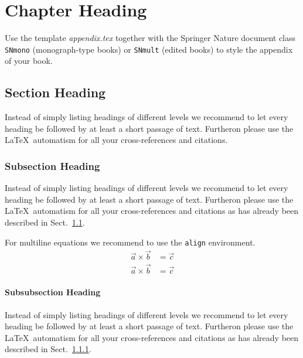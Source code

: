 \appendix
\chapter{Chapter Heading}
\label{introA} %

Use the template \emph{appendix.tex} together with the Springer Nature document class \texttt{SNmono} (monograph-type books) or \texttt{SNmult} (edited books) to style the appendix of your book.


\section{Section Heading}
\label{sec:A1}
Instead of simply listing headings of different levels we recommend to let every heading be followed by at least a short passage of text. Furtheron please use the \LaTeX\ automatism for all your cross-references and citations.


\subsection{Subsection Heading}
\label{sec:A2}
Instead of simply listing headings of different levels we recommend to let every heading be followed by at least a short passage of text. Furtheron please use the \LaTeX\ automatism for all your cross-references and citations as has already been described in Sect.~\ref{sec:A1}.

For multiline equations we recommend to use the \verb|align| environment.
\begin{align}
\vec{a}\times\vec{b}&=\vec{c} \nonumber\\
\vec{a}\times\vec{b}&=\vec{c}
\label{eq:A01}
\end{align}

\subsubsection{Subsubsection Heading}
Instead of simply listing headings of different levels we recommend to let every heading be followed by at least a short passage of text. Furtheron please use the \LaTeX\ automatism for all your cross-references and citations as has already been described in Sect.~\ref{sec:A2}.

